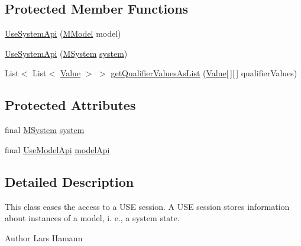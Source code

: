 \subsection*{Protected Member Functions}
\begin{DoxyCompactItemize}
\item 
\hyperlink{classorg_1_1tzi_1_1use_1_1api_1_1_use_system_api_a16930de4070d82c17d836381269a05af}{Use\-System\-Api} (\hyperlink{classorg_1_1tzi_1_1use_1_1uml_1_1mm_1_1_m_model}{M\-Model} model)
\item 
\hyperlink{classorg_1_1tzi_1_1use_1_1api_1_1_use_system_api_a14a23022608c03eb73640b87d011ce1a}{Use\-System\-Api} (\hyperlink{classorg_1_1tzi_1_1use_1_1uml_1_1sys_1_1_m_system}{M\-System} \hyperlink{classorg_1_1tzi_1_1use_1_1api_1_1_use_system_api_aabe59f3d91d8ec4b257ec0fce2339a28}{system})
\item 
List$<$ List$<$ \hyperlink{classorg_1_1tzi_1_1use_1_1uml_1_1ocl_1_1value_1_1_value}{Value} $>$ $>$ \hyperlink{classorg_1_1tzi_1_1use_1_1api_1_1_use_system_api_a13de7ea7c0417d0937c9c204b8a3710a}{get\-Qualifier\-Values\-As\-List} (\hyperlink{classorg_1_1tzi_1_1use_1_1uml_1_1ocl_1_1value_1_1_value}{Value}\mbox{[}$\,$\mbox{]}\mbox{[}$\,$\mbox{]} qualifier\-Values)
\end{DoxyCompactItemize}
\subsection*{Protected Attributes}
\begin{DoxyCompactItemize}
\item 
final \hyperlink{classorg_1_1tzi_1_1use_1_1uml_1_1sys_1_1_m_system}{M\-System} \hyperlink{classorg_1_1tzi_1_1use_1_1api_1_1_use_system_api_aabe59f3d91d8ec4b257ec0fce2339a28}{system}
\item 
final \hyperlink{classorg_1_1tzi_1_1use_1_1api_1_1_use_model_api}{Use\-Model\-Api} \hyperlink{classorg_1_1tzi_1_1use_1_1api_1_1_use_system_api_a58e4e96ae61b511b5e0c7a6482f893a7}{model\-Api}
\end{DoxyCompactItemize}


\subsection{Detailed Description}
This class eases the access to a U\-S\-E session. A U\-S\-E session stores information about instances of a model, i. e., a system state.

\begin{DoxyAuthor}{Author}
Lars Hamann 
\end{DoxyAuthor}


